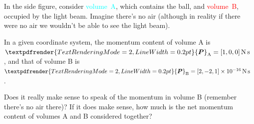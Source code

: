 \documentclass[a4paper,12pt,%
onecolumn,oneside,%
british%
]{memoir}
\renewcommand*{\bm}[1]{\textpdfrender{TextRenderingMode=2,LineWidth=0.2pt}{\boldsymbol{#1}}}
\renewcommand*{\|}[1][]{\nonscript\:#1\vert\nonscript\:\mathopen{}}
\newcommand*{\yP}{\bm{P}}
\begin{document}
\section{}
\label{sec:P_ball_light}

%
In the side figure, consider \textcolor{cyan}{volume~A}, which contains the ball, and \textcolor{red}{volume~B}, occupied by the light beam. Imagine there's no air (although in reality if there were no air we wouldn't be able to see the light beam).

In a given coordinate system, the momentum content of volume A is $\yP_{\text{A}} = [1, 0,0 ]\,\unit{N\,s}$, and that of volume B is $\yP_{\text{B}} = [2, -2, 1]\times\qty[print-unity-mantissa=false]{1e-16}{N\,s}$.

Does it really make sense to speak of the momentum in volume B (remember there's no air there)? If it does make sense, how much is the net momentum content of volumes A and B considered together?


\section{}
\label{sec:flux_sense}
\end{document}

